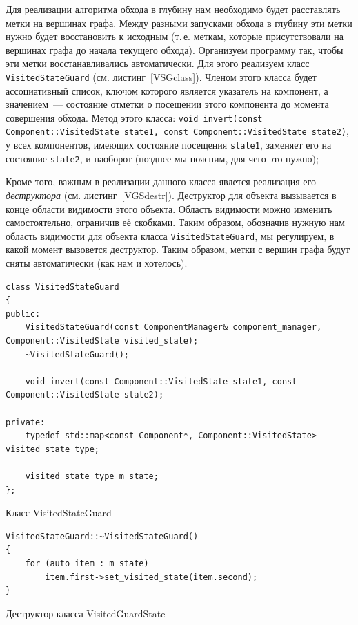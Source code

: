 Для реализации алгоритма обхода в глубину нам необходимо будет расставлять метки на вершинах графа. Между разными запусками обхода в глубину эти метки нужно будет восстановить к исходным (т.\,е. меткам, которые присутствовали на вершинах графа до начала текущего обхода). Организуем программу так, чтобы эти метки восстанавливались автоматически. Для этого реализуем класс \lstinline!VisitedStateGuard! (см. листинг~\ref{VSGclass}). Членом этого класса будет ассоциативный список, ключом которого является указатель на компонент, а значением~--- состояние отметки о посещении этого компонента до момента совершения обхода. Метод этого класса: \lstinline!void invert(const Component::VisitedState state1, const Component::VisitedState state2)!, у всех компонентов, имеющих состояние посещения \lstinline!state1!, заменяет его на состояние \lstinline!state2!, и наоборот (позднее мы поясним, для чего это нужно);

Кроме того, важным в реализации данного класса явлется реализация его \textit{деструктора} (см. листинг~\ref{VGSdestr}). Деструктор для объекта вызывается в конце области видимости этого объекта. Область видимости можно изменить самостоятельно, ограничив её скобками. Таким образом, обозначив нужную нам область видимости для объекта класса \lstinline!VisitedStateGuard!, мы регулируем, в какой момент вызовется деструктор. Таким образом, метки с вершин графа будут сняты автоматически (как нам и хотелось).

\begin{ListingEnv}
	\begin{lstlisting}
class VisitedStateGuard
{
public:
	VisitedStateGuard(const ComponentManager& component_manager, Component::VisitedState visited_state);
	~VisitedStateGuard();
	
	void invert(const Component::VisitedState state1, const Component::VisitedState state2);

private:
	typedef std::map<const Component*, Component::VisitedState> visited_state_type;
	
	visited_state_type m_state;
};		
	\end{lstlisting}
	\caption{Класс VisitedStateGuard}\label{VSGclass}
\end{ListingEnv}

\begin{ListingEnv}
	\begin{lstlisting}
VisitedStateGuard::~VisitedStateGuard()
{
    for (auto item : m_state)
        item.first->set_visited_state(item.second);
}
	\end{lstlisting}
	\caption{Деструктор класса VisitedGuardState}\label{VGSdestr}
\end{ListingEnv}

